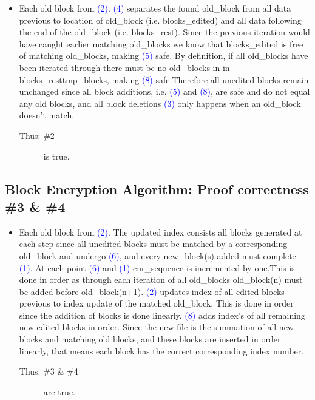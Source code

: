 \documentclass[11pt]{article}
\newcommand{\blue}[1]{\textcolor{blue}{#1}}
\begin{document}
\begin{itemize}
\item Each old block from \blue{(2)}. \blue{(4)} separates the found old\_block from all data previous to location of old\_block (i.e. blocks\_edited) and all data following the end of the old\_block (i.e. blocks\_rest). Since the previous iteration would have caught earlier matching old\_blocks we know that blocks\_edited is free of matching old\_blocks, making \blue{(5)} safe. By definition, if all old\_blocks have been iterated through there must be no old\_blocks in in blocks\_rest\/tmp\_blocks, making \blue{(8)} safe.Therefore all unedited blocks remain unchanged since all block additions, i.e. \blue{(5)} and \blue{(8)}, are safe and do not equal any old blocks, and all block deletions \blue{(3)} only happens when an old\_block doesn't match.
\begin{description} 
\item[Thus: \#2] is true.
\end{description}
\end{itemize}

\subsection{Block Encryption Algorithm: Proof correctness \#3 \& \#4}

\begin{itemize}
\item  Each old block from \blue{(2)}. The updated index consists all blocks generated at each step since all unedited blocks must be matched by a corresponding old\_block and undergo \blue{(6)}, and every new\_block(s) added must complete \blue{(1)}. At each point \blue{(6)} and \blue{(1)} cur\_sequence is incremented by one.This is done in order as through each iteration of all old\_blocks old\_block(n) must be added before old\_block(n+1). \blue{(2)} updates index of all edited blocks previous to index update of the matched old\_block. This is done in order since the addition of blocks is done linearly. \blue{(8)} adds index's of all remaining new edited blocks in order. Since the new file is the summation of all new blocks and matching old blocks, and these blocks are inserted in order linearly, that means each block has the correct corresponding index number.
\begin{description}
\item[Thus: \#3 \& \#4] are true.
\end{description}
\end{itemize}
\end{document}
